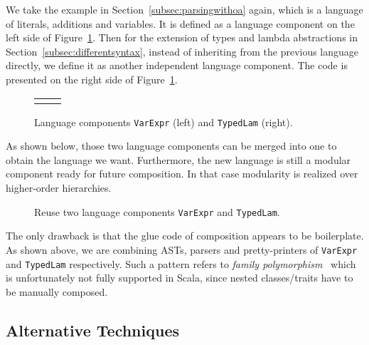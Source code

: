 We take the example in Section~\ref{subsec:parsingwithoa} again, which is a language of literals, additions and variables. It is defined as a
language component on the left side of Figure~\ref{fig:lng-components}.
Then for the extension of types and lambda abstractions in Section~\ref{subsec:differentsyntax}, instead of inheriting from the previous language directly, we define it as another independent language component. The code is presented on the right side of Figure~\ref{fig:lng-components}.

\begin{figure}[t]
\begin{tabular}{m{0.42\linewidth}m{0.52\linewidth}}
&
\end{tabular}
\caption{Language components \lstinline{VarExpr} (left) and \lstinline{TypedLam} (right).}\label{fig:lng-components}
\end{figure}

As shown below, those two language components can be merged into one to obtain the language we want. Furthermore, the new language is still a modular
component ready for future composition. In that case modularity is realized over higher-order hierarchies.

\begin{figure}[t]
\caption{Reuse two language components \lstinline{VarExpr} and \lstinline{TypedLam}.}\label{fig:compose-components}
\end{figure}

The only drawback is that the glue code of composition appears to be
boilerplate. As shown above, we are combining ASTs, parsers and
pretty-printers of \lstinline{VarExpr} and \lstinline{TypedLam}
respectively. Such a pattern refers to \textit{family
  polymorphism}~\cite{ernst01FP} which is unfortunately not fully supported
in Scala, since nested classes/traits have to be manually composed. 

\subsection{Alternative Techniques}

